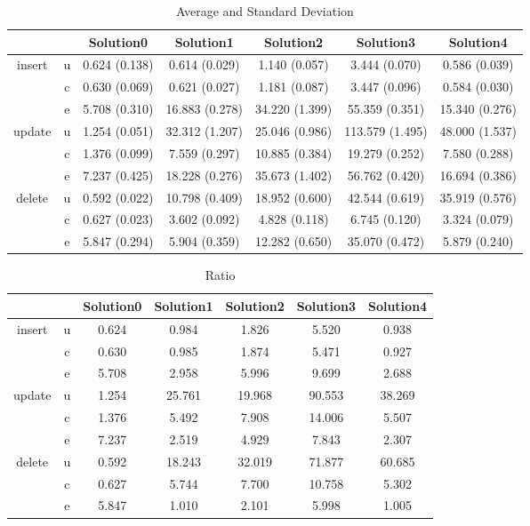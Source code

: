 \begin{table}[h]
\newcommand{\B}[1]{\colorbox{light-gray}{#1}}
 \centering
\caption{Average and Standard Deviation}\label{t:}
\begin{tabular}{ccccccc}
\toprule
&&Solution0 & Solution1 & Solution2 & Solution3 & Solution4\\
\midrule
\multirow{3}{*}{insert} & u & 0.624 (0.138) & 0.614 (0.029) & 1.140 (0.057) & 3.444 (0.070) & 0.586 (0.039)\\
 & c & 0.630 (0.069) & 0.621 (0.027) & 1.181 (0.087) & 3.447 (0.096) & 0.584 (0.030)\\
 & e & 5.708 (0.310) & 16.883 (0.278) & 34.220 (1.399) & 55.359 (0.351) & 15.340 (0.276)\\
\midrule
\multirow{3}{*}{update} & u & 1.254 (0.051) & 32.312 (1.207) & 25.046 (0.986) & 113.579 (1.495) & 48.000 (1.537)\\
 & c & 1.376 (0.099) & 7.559 (0.297) & 10.885 (0.384) & 19.279 (0.252) & 7.580 (0.288)\\
 & e & 7.237 (0.425) & 18.228 (0.276) & 35.673 (1.402) & 56.762 (0.420) & 16.694 (0.386)\\
\midrule
\multirow{3}{*}{delete} & u & 0.592 (0.022) & 10.798 (0.409) & 18.952 (0.600) & 42.544 (0.619) & 35.919 (0.576)\\
 & c & 0.627 (0.023) & 3.602 (0.092) & 4.828 (0.118) & 6.745 (0.120) & 3.324 (0.079)\\
 & e & 5.847 (0.294) & 5.904 (0.359) & 12.282 (0.650) & 35.070 (0.472) & 5.879 (0.240)\\
\bottomrule
\end{tabular}
\end{table}



\begin{table}[h]
\newcommand{\B}[1]{\colorbox{light-gray}{#1}}
 \centering
\caption{Ratio}\label{t:}
\begin{tabular}{ccccccc}
\toprule
&&Solution0 & Solution1 & Solution2 & Solution3 & Solution4\\
\midrule
\multirow{3}{*}{insert} & u & 0.624 & 0.984 & 1.826 & 5.520 & 0.938\\
 & c & 0.630 & 0.985 & 1.874 & 5.471 & 0.927\\
 & e & 5.708 & 2.958 & 5.996 & 9.699 & 2.688\\
\midrule
\multirow{3}{*}{update} & u & 1.254 & 25.761 & 19.968 & 90.553 & 38.269\\
 & c & 1.376 & 5.492 & 7.908 & 14.006 & 5.507\\
 & e & 7.237 & 2.519 & 4.929 & 7.843 & 2.307\\
\midrule
\multirow{3}{*}{delete} & u & 0.592 & 18.243 & 32.019 & 71.877 & 60.685\\
 & c & 0.627 & 5.744 & 7.700 & 10.758 & 5.302\\
 & e & 5.847 & 1.010 & 2.101 & 5.998 & 1.005\\
\bottomrule
\end{tabular}
\end{table}







